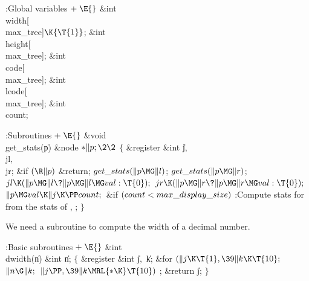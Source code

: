 \Y\B\4:Global variables\X${}\mathrel+\E{}$\6
\&{int} \\{width}[\\{max\_tree}]${}\K\{\T{1}\}{}$;\6
\&{int} \\{height}[\\{max\_tree}];\6
\&{int} \\{code}[\\{max\_tree}];\6
\&{int} \\{lcode}[\\{max\_tree}];\6
\&{int} \\{count};\par
\fi

\B{}:Subroutines\X${}\mathrel+\E{}$\6
\&{void} \\{get\_stats}(\|p)\1\1\6
\&{node} ${}{*}\|p;\2\2{}$\6
${}\{{}$\1\6
\&{register} \&{int} \|j${},{}$ \\{jl}${},{}$ \\{jr};\7
\&{if} ${}(\R\|p){}$\1\5
\&{return};\2\6
${}\\{get\_stats}(\|p\MG\|l){}$;\5
${}\\{get\_stats}(\|p\MG\|r){}$;\6
${}\\{jl}\K(\|p\MG\|l\?\|p\MG\|l\MG\\{val}:\T{0});{}$\6
${}\\{jr}\K(\|p\MG\|r\?\|p\MG\|r\MG\\{val}:\T{0});{}$\6
${}\|p\MG\\{val}\K\|j\K\PP\\{count};{}$\6
\&{if} ${}(\\{count}<\\{max\_display\_size}){}$\1\5
:Compute stats for  from the stats of , \X;\2%
\6
\4${}\}{}$\2\par
\fi

We need a subroutine to compute the width of a decimal
number.

\Y\B\4:Basic subroutines\X${}\mathrel+\E{}$\6
\&{int} \\{dwidth}(\|n)\1\1\6
\&{int} \|n;\2\2\6
${}\{{}$\1\6
\&{register} \&{int} \|j${},{}$ \|k;\7
\&{for} ${}(\|j\K\T{1},\39\|k\K\T{10};{}$ ${}\|n\G\|k;{}$ ${}\|j\PP,\39\|k%
\MRL{*{\K}}\T{10}){}$\1\5
;\2\6
\&{return} \|j;\6
\4${}\}{}$\2\par
\fi

